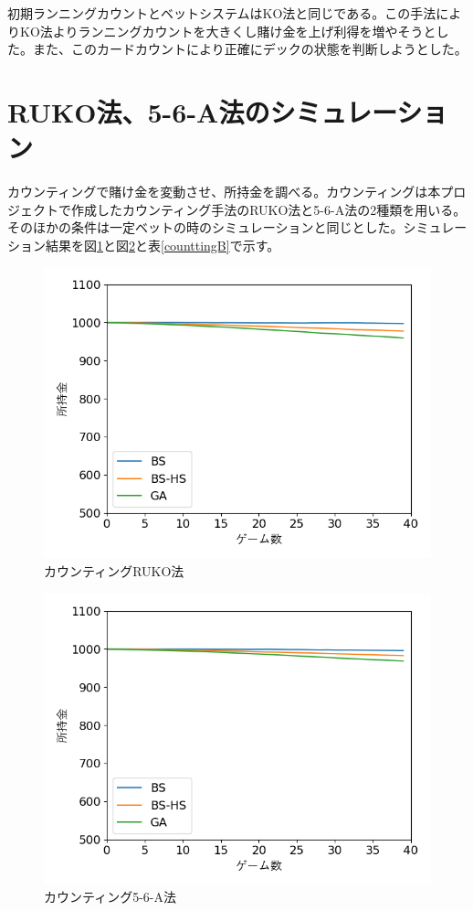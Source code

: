 初期ランニングカウントとベットシステムはKO法と同じである。この手法によりKO法よりランニングカウントを大きくし賭け金を上げ利得を増やそうとした。また、このカードカウントにより正確にデックの状態を判断しようとした。

\section{RUKO法、5-6-A法のシミュレーション}
カウンティングで賭け金を変動させ、所持金を調べる。カウンティングは本プロジェクトで作成したカウンティング手法のRUKO法と5-6-A法の2種類を用いる。そのほかの条件は一定ベットの時のシミュレーションと同じとした。シミュレーション結果を図\ref{RUKO}と図\ref{56A}と表\ref{counttingB}で示す。


\begin{figure}[H]
 \begin{center} 
  \includegraphics[width=0.7\linewidth]{./figure/betsimulation-RUKO}
  \caption{カウンティングRUKO法\label{RUKO}}
 \end{center}
\end{figure}

\begin{figure}[H]
 \begin{center} 
  \includegraphics[width=0.7\linewidth]{./figure/betsimulation-56A}
  \caption{カウンティング5-6-A法\label{56A}}
 \end{center}
\end{figure}

